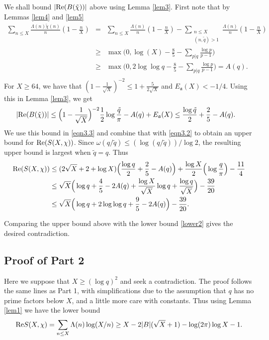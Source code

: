 \documentclass [12pt]{amsart}
\numberwithin{equation}{section}
\newcommand{\tRe}{\textup{Re}}
\begin{document}
We shall bound $|\tRe (B(\tilde \chi))|$ above using 
Lemma \ref{lem3}.  First note that by Lemmas \ref{lem4} and \ref{lem5}
\begin{eqnarray*}
\sum_{n\leq X} \frac{\Lambda(n){\tilde \chi}(n)}{n} \left(1-\frac{n}{X}\right)
&=& \sum_{n\leq X} \frac{\Lambda(n)}{n} \left(1-\frac{n}{X}\right) - \sum_{\substack{n\leq X\\(n, \tilde q) > 1}} \frac{\Lambda(n)}{n} \left(1-\frac{n}{X}\right)\\
&\geq&\max \Big(0,  \log (X) - \frac{8}{5}- \sum_{p|q} \frac{\log p}{p-1}\Big)\\ 
&\ge& \max\Big( 0, 2\log \log q -\frac{8}{5} -\sum_{p|q} \frac{\log p}{p-1}\Big) = A(q).\\
\end{eqnarray*} 
For $X \geq 64$, we have that $(1-\frac{1}{\sqrt{X}})^{-2} \leq 1 + \frac{5}{2\sqrt{X}}$ and $E_\mathfrak a (X) <-1/4$.    
Using this in Lemma \ref{lem3}, we get 
\begin{align*}
|\tRe(B(\tilde \chi))| &\le \Big( 1-\frac{1}{\sqrt{X}}\Big)^{-2} \frac 12 \log \frac{\tilde q}{\pi} - A(q) + E_{\frak a}(X) \le \frac{\log\tilde q}{2}+ \frac 25 -A(q).
\end{align*}
We use this bound in \eqref{eqn3.3} and combine that with \eqref{eqn3.2} to obtain 
an upper bound for $\tRe(S(X,\chi))$.  Since $\omega(q/{\tilde q}) \le (\log (q/\tilde q))/\log 2$,
 the resulting upper bound is largest when $\tilde q=q$.  
Thus 
\begin{align*}
\tRe (S(X,\chi)) &\le (2\sqrt{X}+2+ \log X) \Big(\frac{\log q}{2} + \frac 25 -A(q)\Big) + \frac{\log X}{2} \Big(\log 
 \frac q\pi\Big) - \frac {11}{4}  \\
 &\le \sqrt{X} \Big( \log q + \frac 45 -2 A(q) + \frac{\log X}{\sqrt{X}} \log q + \frac{\log q}{\sqrt{X}}\Big)-\frac{39}{20} \\ 
 &\le \sqrt{X} \Big( \log q + 2\log \log q + \frac 95 -2 A(q)\Big)-\frac{39}{20}.
\end{align*}
 
 Comparing the upper bound above with the lower bound \eqref{lower2} gives the 
 desired contradiction.    


\subsection{Proof of Part 2}  Here we suppose that $X \geq (\log q)^2$ and 
seek a contradiction.  The proof follows the same lines as Part 1, with 
simplifications due to the assumption that $q$ has no prime factors below $X$, and 
a little more care with constants.   
Thus using Lemma \ref{lem1} 
we have the lower bound 
\begin{equation}\label{eqlow1}
\tRe S(X,\chi)= \sum_{n\le X} \Lambda(n) \log (X/n)
\ge X - 2|B|(\sqrt{X}+1) - \log (2\pi) \log X - 1.
\end{equation}
\end{document}
